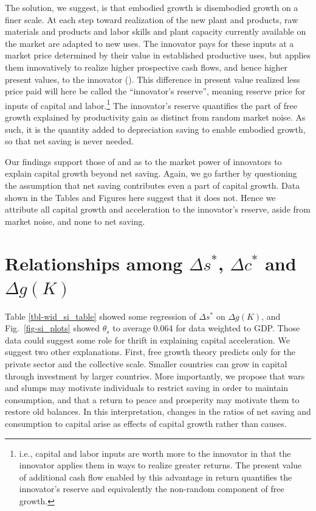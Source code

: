 \documentclass[a4paper,fleqn]{latex_styles/cas-sc}
\begin{document}
The solution, we suggest, is that embodied growth is disembodied growth
on a finer scale. At each step toward realization of the new plant and
products, raw materials and products and labor skills and plant capacity
currently available on the market are adapted to new uses. The innovator
pays for these inputs at a market price determined by their value in
established productive uses, but applies them innovatively to realize
higher prospective cash flows, and hence higher present values, to the
innovator
(\citet{marshallPrinciplesEconomics1890, schumpeterTheoryEconomicDevelopment1934}).
This difference in present value realized less price paid will here be
called the ``innovator's reserve'', meaning reserve price for inputs of
capital and labor.\footnote{i.e., capital and labor inputs are worth
  more to the innovator in that the innovator applies them in ways to
  realize greater returns. The present value of additional cash flow
  enabled by this advantage in return quantifies the innovator's reserve
  and equivalently the non-random component of free growth.} The innovator's reserve quantifies the
part of free growth explained by productivity gain as distinct from
random market noise. As such, it is the quantity added to depreciation
saving to enable embodied growth, so that net saving is never
needed.

Our findings support those of \cite{picketyCapitalIsBack2014} and \cite{kurz2023market} as to the market power of innovators to explain capital growth beyond net saving. Again, we go farther by questioning the assumption that net saving contributes even a part of capital growth. Data shown in the Tables and Figures here suggest that it does not. Hence we attribute all capital growth and acceleration to the innovator's reserve, aside from market noise, and none to net saving.

\section{Relationships among \(\Delta s^*\), \(\Delta c^*\) and \(\Delta g(K)\)\label{sec-relscg}}

Table \ref{tbl-wid_si_table} showed some regression of \(\Delta s^*\) on \(\Delta g(K)\), and Fig.~\ref{fig-si_plots} showed \(\theta_s\) to average 0.064 for data weighted to GDP. Those data could suggest some role for thrift in explaining capital acceleration. We suggest two other explanations. First, free growth theory predicts only for the private sector and the collective scale. Smaller countries can grow in capital through investment by larger countries.
More importantly, we propose that wars and slumps may motivate individuals to restrict saving in order to maintain consumption, and that a return to peace and prosperity may motivate them to restore old balances. In this interpretation, changes in the ratios of net saving and consumption to capital arise as effects of capital growth rather than causes.
\end{document}

